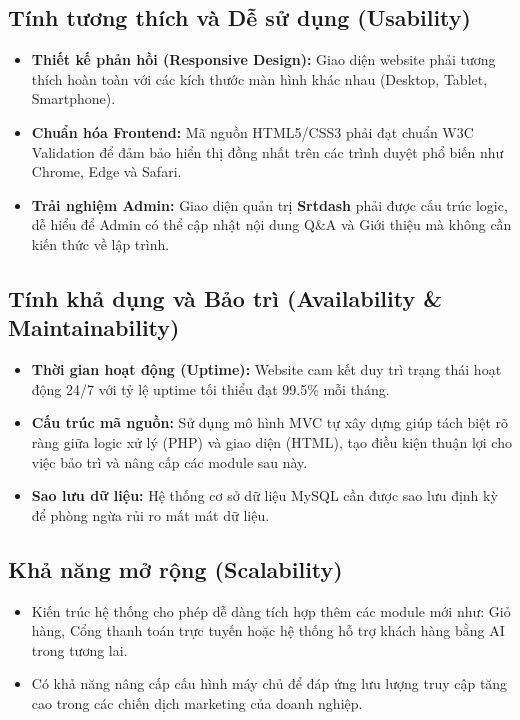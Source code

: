 \subsection{Tính tương thích và Dễ sử dụng (Usability)}
\begin{itemize}
    \item \textbf{Thiết kế phản hồi (Responsive Design):} Giao diện website phải tương thích hoàn toàn với các kích thước màn hình khác nhau (Desktop, Tablet, Smartphone).
    \item \textbf{Chuẩn hóa Frontend:} Mã nguồn HTML5/CSS3 phải đạt chuẩn W3C Validation để đảm bảo hiển thị đồng nhất trên các trình duyệt phổ biến như Chrome, Edge và Safari.
    \item \textbf{Trải nghiệm Admin:} Giao diện quản trị \textbf{Srtdash} phải được cấu trúc logic, dễ hiểu để Admin có thể cập nhật nội dung Q\&A và Giới thiệu mà không cần kiến thức về lập trình.
\end{itemize}

\subsection{Tính khả dụng và Bảo trì (Availability \& Maintainability)}
\begin{itemize}
    \item \textbf{Thời gian hoạt động (Uptime):} Website cam kết duy trì trạng thái hoạt động 24/7 với tỷ lệ uptime tối thiểu đạt 99.5\% mỗi tháng.
    \item \textbf{Cấu trúc mã nguồn:} Sử dụng mô hình MVC tự xây dựng giúp tách biệt rõ ràng giữa logic xử lý (PHP) và giao diện (HTML), tạo điều kiện thuận lợi cho việc bảo trì và nâng cấp các module sau này.
    \item \textbf{Sao lưu dữ liệu:} Hệ thống cơ sở dữ liệu MySQL cần được sao lưu định kỳ để phòng ngừa rủi ro mất mát dữ liệu.
\end{itemize}

\subsection{Khả năng mở rộng (Scalability)}
\begin{itemize}
    \item Kiến trúc hệ thống cho phép dễ dàng tích hợp thêm các module mới như: Giỏ hàng, Cổng thanh toán trực tuyến hoặc hệ thống hỗ trợ khách hàng bằng AI trong tương lai.
    \item Có khả năng nâng cấp cấu hình máy chủ để đáp ứng lưu lượng truy cập tăng cao trong các chiến dịch marketing của doanh nghiệp.
\end{itemize}